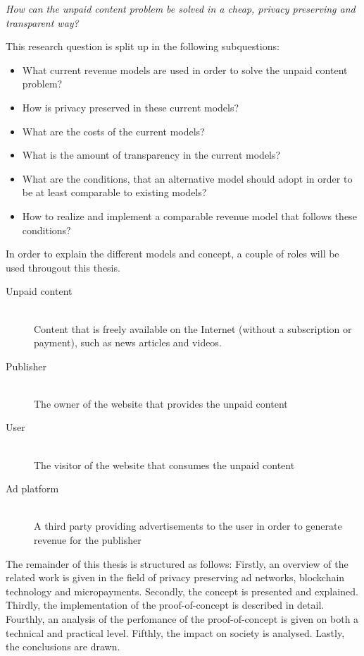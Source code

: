 \textit{How can the unpaid content problem be solved in a cheap, privacy preserving and transparent way?}
\vspace{1em}

\noindent This research question is split up in the following subquestions:

\begin{itemize}
  \item What current revenue models are used in order to solve the unpaid content problem?
  \item How is privacy preserved in these current models?
  \item What are the costs of the current models?
  \item What is the amount of transparency in the current models?
  \item What are the conditions, that an alternative model should adopt in order to be at least comparable to existing models?
  \item How to realize and implement a comparable revenue model that follows these conditions?
\end{itemize}

\label{sec:methodology}
\noindent In order to explain the different models and concept, a couple of roles will be used througout this thesis.

\begin{description}
  \item[Unpaid content] \hfill \\ Content that is freely available on the Internet (without a subscription or payment), such as news articles and videos.
  \item[Publisher] \hfill \\ The owner of the website that provides the unpaid content
  \item[User] \hfill \\ The visitor of the website that consumes the unpaid content
  \item[Ad platform] \hfill \\ A third party providing advertisements to the user in order to generate revenue for the publisher
\end{description} 

\noindent The remainder of this thesis is structured as follows: Firstly, an overview of the related work is given in the field of privacy preserving ad networks, blockchain technology and micropayments. Secondly, the concept is presented and explained. Thirdly, the implementation of the proof-of-concept is described in detail. Fourthly, an analysis of the perfomance of the proof-of-concept is given on both a technical and practical level. Fifthly, the impact on society is analysed. Lastly, the conclusions are drawn.